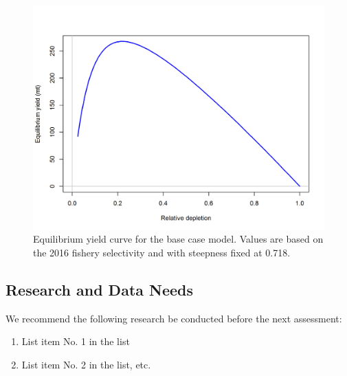 \documentclass[12pt,]{article}
\begin{document}
\begin{figure}[htbp]
\centering
\includegraphics{r4ss/plots_mod1/yield1_yield_curve.png}
\caption{Equilibrium yield curve for the base case model. Values are
based on the 2016 fishery selectivity and with steepness fixed at 0.718.
\label{fig:Yield_all}}
\end{figure}

\FloatBarrier

\newpage

\subsection*{Research and Data Needs}\label{research-and-data-needs}

We recommend the following research be conducted before the next
assessment:

\begin{enumerate}

\item List item No. 1 in the list

\item List item No. 2 in the list, etc.

\end{enumerate}

\FloatBarrier

\newpage

\renewcommand{\thefigure}{\arabic{figure}}
\renewcommand{\thetable}{\arabic{table}}

\setcounter{figure}{0} \setcounter{table}{0}
\end{document}
